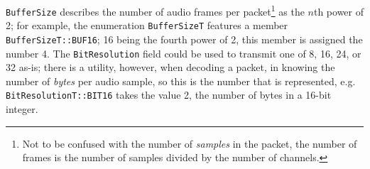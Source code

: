
\texttt{BufferSize} describes the number of audio frames per packet\footnote{
    Not to be confused with the number of \textit{samples} in the packet, the
    number of frames is the number of samples divided by the number of channels.
} as the $n$th power of 2; for example, the enumeration \texttt{BufferSizeT}
features a member \texttt{BufferSizeT::BUF16}; 16 being the fourth power of 2,
this member is assigned the number 4.
The \texttt{BitResolution} field could be used to transmit one of 8, 16, 24, or
32 as-is; there is a utility, however, when decoding a packet, in knowing the
number of \textit{bytes} per audio sample, so this is the number that is
represented, e.g. \texttt{BitResolutionT::BIT16} takes the value 2, the number
of bytes in a 16-bit integer.

